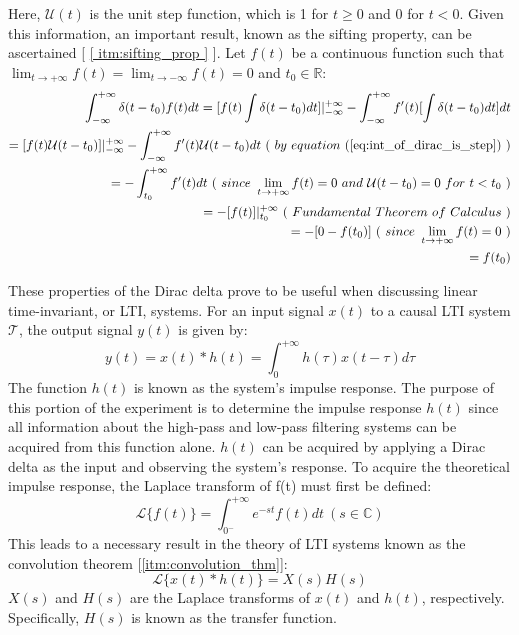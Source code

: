 Here, $\mathcal{U}(t)$ is the unit step function, which is 1 for $t \geq 0$ and 0 for $t < 0$. Given this information, an important result, known as the sifting property, can be ascertained [ \ref{ itm:sifting_prop } ]. Let $f(t)$ be a continuous function such that $\lim_{ t \to +\infty } f(t) = \lim_{ t \to -\infty } f(t) = 0$ and $t_0 \in \mathbb{R}$:
\begin{equation}
	\label{eq:sifting_property}
	\begin{aligned}
	\int_{-\infty}^{+\infty} \delta( t - t_0 ) f(t) dt = [ f(t)\int \delta( t - t_0 ) dt ]\rvert_{-\infty}^{+\infty} - \int_{-\infty}^{+\infty} f'(t)[ \int \delta( t - t_0 ) dt ]dt \\
							   = [ f(t)\mathcal{U}( t - t_0 ) ]\rvert_{-\infty}^{+\infty} - \int_{-\infty}^{+\infty} f'(t)\mathcal{U}( t - t_0 )dt \ ( \ by \ equation \ (\ref{eq:int_of_dirac_is_step}) \ ) \\
							   = -\int_{t_0}^{+\infty} f'(t)dt \ ( \ since \ \lim_{ t \to +\infty } f(t) = 0 \ and \ \mathcal{U}( t - t_0 ) = 0 \ for \ t < t_0 \ ) \\
							   = -[ f(t) ]\rvert_{t_0}^{+\infty} \ ( \ Fundamental \ Theorem \ of \ Calculus \ ) \\
							   = -[ 0 - f(t_0) ] \ ( \ since \ \lim_{ t \to +\infty } f(t) = 0 \ ) \\
							   = f(t_0) \\
	\end{aligned}
\end{equation}

These properties of the Dirac delta prove to be useful when discussing linear time-invariant, or LTI, systems. For an input signal $x(t)$ to a causal LTI system $\mathcal{T}$, the output signal $y(t)$ is given by:
\begin{equation}
	\label{eq:causal_lti_conv}
	y(t) = x(t) * h(t) = \int_{0}^{+\infty} h(\tau)x(t-\tau)d\tau
\end{equation}
The function $h(t)$ is known as the system's impulse response. The purpose of this portion of the experiment is to determine the impulse response $h(t)$ since all information about the high-pass and low-pass filtering systems can be acquired from this function alone. $h(t)$ can be acquired by applying a Dirac delta as the input and observing the system's response.
To acquire the theoretical impulse response, the Laplace transform of f(t) must first be defined:
\begin{equation}
	\label{eq:lt_def}
	\mathcal{L}\{f(t)\} = \int_{0^{-}}^{+\infty} e^{-st}f(t)dt \ ( s \in \mathbb{C} )
\end{equation}
This leads to a necessary result in the theory of LTI systems known as the convolution theorem [\ref{itm:convolution_thm}]:
\begin{equation}
	\label{eq:conv_thm}
	\mathcal{L}\{ x(t) * h(t) \} = X(s)H(s)
\end{equation}
$X(s)$ and $H(s)$ are the Laplace transforms of $x(t)$ and $h(t)$, respectively. Specifically, $H(s)$ is known as the transfer function.

